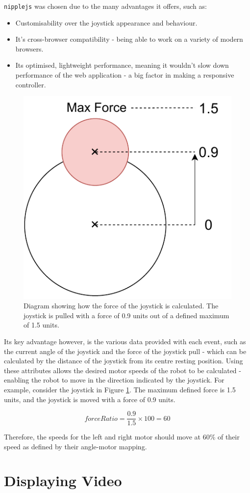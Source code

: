 \documentclass{l4proj}
\begin{document}
\lstinline{nipplejs} was chosen due to the many advantages it offers, such as:
\begin{itemize}
    \item Customisability over the joystick appearance and behaviour.
    \item It’s cross-browser compatibility - being able to work on a variety of modern browsers.
    \item Its optimised, lightweight performance, meaning it wouldn't slow down performance of the web application - a big factor in making a responsive controller.
\end{itemize}

\begin{figure}[!ht]
    \centering
    \includegraphics[width=0.35\linewidth]{images/joystick-force.pdf}
    \caption{Diagram showing how the force of the joystick is calculated. The joystick is pulled with a force of 0.9 units out of a defined maximum of 1.5 units.}
    \label{fig:joystick-force}
\end{figure}

Its key advantage however, is the various data provided with each event, such as the current angle of the joystick and the force of the joystick pull - which can be calculated by the  distance of the joystick from its centre resting position. Using these attributes allows the desired motor speeds of the robot to be calculated - enabling the robot to move in the direction indicated by the joystick. For example, consider the joystick in Figure \ref{fig:joystick-force}. The maximum defined force is 1.5 units, and the joystick is moved with a force of 0.9 units.

\begin{equation}
   forceRatio = \frac{0.9}{1.5} \times 100 = 60 
\end{equation}

Therefore, the speeds for the left and right motor should move at 60\% of their speed as defined by their angle-motor mapping.


\section{Displaying Video}
\end{document}

